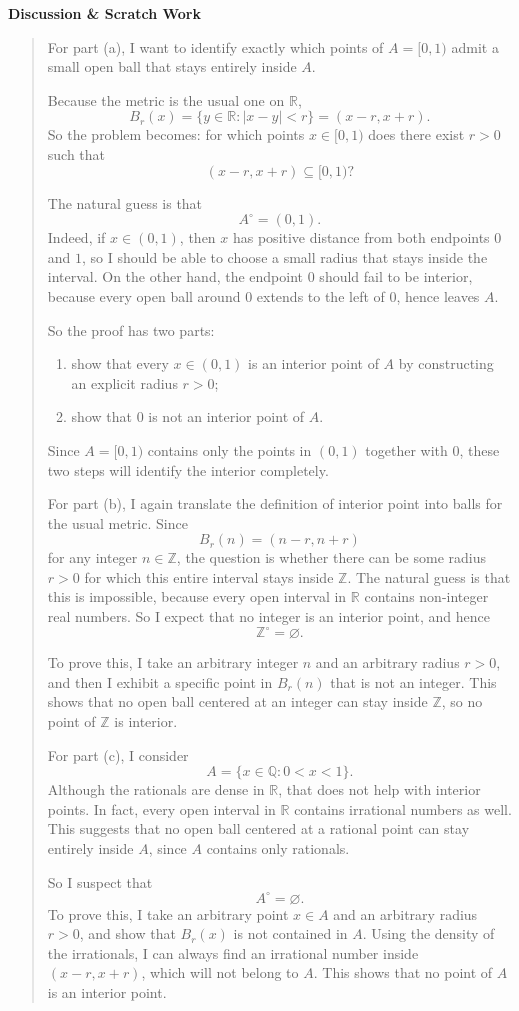 \documentclass[12pt]{article}
\newenvironment{scratch}{%
  \par\smallskip
  \noindent\textbf{Discussion \& Scratch Work}\begin{quote}\small
}{%
  \end{quote}\smallskip
}
\begin{document}
\begin{scratch}
For part (a), I want to identify exactly which points of $A=[0,1)$ admit a small open ball that stays entirely inside $A$.

Because the metric is the usual one on $\mathbb{R}$,
\[
B_r(x)=\{y\in\mathbb{R}:|x-y|<r\}=(x-r,x+r).
\]
So the problem becomes: for which points $x\in[0,1)$ does there exist $r>0$ such that
\[
(x-r,x+r)\subseteq [0,1)?
\]

The natural guess is that
\[
A^\circ=(0,1).
\]
Indeed, if $x\in(0,1)$, then $x$ has positive distance from both endpoints $0$ and $1$, so I should be able to choose a small radius that stays inside the interval. On the other hand, the endpoint $0$ should fail to be interior, because every open ball around $0$ extends to the left of $0$, hence leaves $A$.

So the proof has two parts:
\begin{enumerate}[label=\textbf{(\arabic*)}]
  \item show that every $x\in(0,1)$ is an interior point of $A$ by constructing an explicit radius $r>0$;
  \item show that $0$ is not an interior point of $A$.
\end{enumerate}
Since $A=[0,1)$ contains only the points in $(0,1)$ together with $0$, these two steps will identify the interior completely.

For part (b), I again translate the definition of interior point into balls for the usual metric. Since
\[
B_r(n)=(n-r,n+r)
\]
for any integer $n\in\mathbb{Z}$, the question is whether there can be some radius $r>0$ for which this entire interval stays inside $\mathbb{Z}$. The natural guess is that this is impossible, because every open interval in $\mathbb{R}$ contains non-integer real numbers. So I expect that no integer is an interior point, and hence
\[
\mathbb{Z}^\circ=\varnothing.
\]

To prove this, I take an arbitrary integer $n$ and an arbitrary radius $r>0$, and then I exhibit a specific point in $B_r(n)$ that is not an integer. This shows that no open ball centered at an integer can stay inside $\mathbb{Z}$, so no point of $\mathbb{Z}$ is interior.

For part (c), I consider
\[
A=\{x\in\mathbb{Q}:0<x<1\}.
\]
Although the rationals are dense in $\mathbb{R}$, that does not help with interior points. In fact, every open interval in $\mathbb{R}$ contains irrational numbers as well. This suggests that no open ball centered at a rational point can stay entirely inside $A$, since $A$ contains only rationals.

So I suspect that
\[
A^\circ=\varnothing.
\]
To prove this, I take an arbitrary point $x\in A$ and an arbitrary radius $r>0$, and show that $B_r(x)$ is not contained in $A$. Using the density of the irrationals, I can always find an irrational number inside $(x-r,x+r)$, which will not belong to $A$. This shows that no point of $A$ is an interior point.
\end{scratch}
\end{document}
